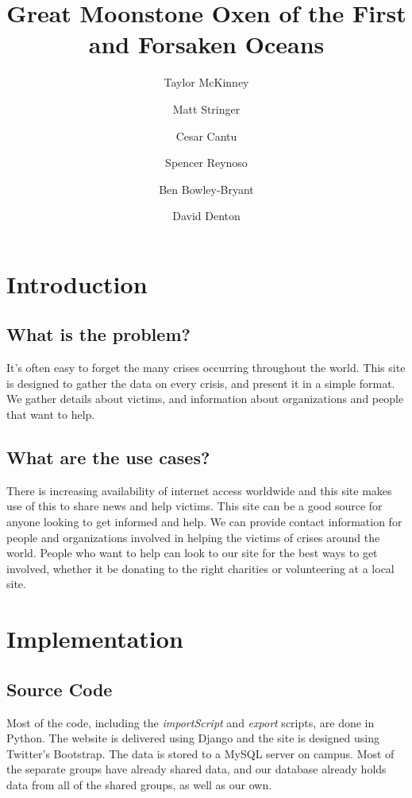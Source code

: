 \documentclass[12pt]{report}
\title{Great Moonstone Oxen of the First and Forsaken Oceans}
\author{
    Taylor McKinney
    \and Matt Stringer
    \and Cesar Cantu
    \and Spencer Reynoso
    \and Ben Bowley-Bryant
    \and David Denton}
\begin{document}
\maketitle

\section*{Introduction}
\subsection*{What is the problem?}
\hfill


It's often easy to forget the many crises occurring throughout the world.
This site is designed to gather the data on every crisis, and present it in a simple format.
We gather details about victims, and information about organizations and people that want to help.

\subsection*{What are the use cases?}
\hfill


There is increasing availability of internet access worldwide and this site makes use of this to share news and help victims.
This site can be a good source for anyone looking to get informed and help. 
We can provide contact information for people and organizations involved in helping the victims of crises around the world.
People who want to help can look to our site for the best ways to get involved, whether it be donating to the right charities or volunteering at a local site.


\newpage
\section*{Implementation}
\hfill


\subsection*{Source Code}
\hfill


Most of the code, including the \emph{importScript} and \emph{export} scripts, are done in Python.
The website is delivered using Django and the site is designed using Twitter's Bootstrap.
The data is stored to a MySQL server on campus.
Most of the separate groups have already shared data,
and our database already holds data from all of the shared groups, as well as our own.\\
\end{document}
